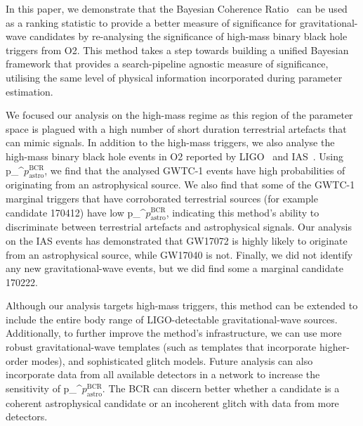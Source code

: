 \documentclass[%
 nofootinbib,
 amsmath,amssymb,
 aps,
 twocolumn
]{revtex4-2}
\newcommand{\fancytext}[1]{{\relax\ifmmode#1\else $#1$\fi}\xspace}
\newcommand{\pastrobcr}{\fancytext{p_\text{astro}^{\text{BCR}}}}
\begin{document}




In this paper, we demonstrate that the Bayesian Coherence Ratio~\cite{BCR1} can be used as a ranking statistic to provide a better measure of significance for gravitational-wave candidates by re-analysing the significance of high-mass binary black hole triggers from O2. This method takes a step towards building a unified Bayesian framework that provides a search-pipeline agnostic measure of significance, utilising the same level of physical information incorporated during parameter estimation. 

We focused our analysis on the high-mass regime as this region of the parameter space is plagued with a high number of short duration terrestrial artefacts that can mimic signals. In addition to the high-mass triggers, we also analyse the high-mass binary black hole events in O2 reported by LIGO~\cite{GWTC1} and IAS~\cite{IAS1, IAS2}. Using \pastrobcr, we find that the analysed GWTC-1 events have high probabilities of originating from an astrophysical source. We also find that some of the GWTC-1 marginal triggers that have corroborated terrestrial sources (for example candidate 170412) have low \pastrobcr, indicating this method's ability to discriminate between terrestrial artefacts and astrophysical signals. Our analysis on the IAS events has demonstrated that GW17072 is highly likely to originate from an astrophysical source, while GW17040 is not. Finally, we did not identify any new gravitational-wave events, but we did find some a marginal candidate 170222. 

Although our analysis targets high-mass triggers, this method can be extended to include the entire body range of LIGO-detectable gravitational-wave sources. Additionally, to further improve the method's infrastructure, we can use more robust gravitational-wave templates (such as templates that incorporate higher-order modes), and sophisticated glitch models. Future analysis can also incorporate data from all available detectors in a network to increase the sensitivity of \pastrobcr. The BCR can discern better whether a candidate is a coherent astrophysical candidate or an incoherent glitch with data from more detectors. 
\end{document}
